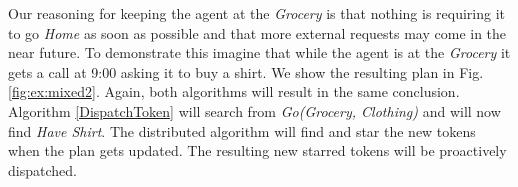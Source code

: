 Our reasoning for keeping the agent at the {\em Grocery} is that nothing is requiring it to go {\em Home}
as soon as possible and that more external requests may come in the near future. To demonstrate this imagine 
that while the agent is at the {\em Grocery} it gets a call at 9:00 asking it to buy a shirt.  We show the resulting plan 
in Fig. \ref{fig:ex:mixed2}. Again, both algorithms will result in the same conclusion. Algorithm \ref{DispatchToken}
will search from {\em Go(Grocery, Clothing)} and will now find {\em Have Shirt}. The distributed algorithm will find
and star the new tokens when the plan gets updated. The resulting new starred tokens will be proactively dispatched.




